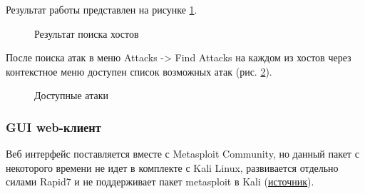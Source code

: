 \documentclass[10pt,a4paper,titlepage]{article}
\begin{document}
Результат работы представлен на рисунке \ref{ris:image4}.
\begin{figure}[h]	
\caption{Результат поиска хостов}
\label{ris:image4}
\end{figure}

После поиска атак в меню Attacks -> Find Attacks на каждом из хостов через контекстное меню доступен список возможных атак (рис. \ref{ris:image5}).
\begin{figure}[h]	
\caption{Доступные атаки}
\label{ris:image5}
\end{figure}

\subsubsection{GUI web-клиент}
Веб интерфейс поставляется вместе с Metasploit Community, но данный пакет с некоторого времени не идет в комплекте с Kali Linux, развивается отдельно силами Rapid7 и не поддерживает пакет metasploit в Kali (\href{https://www.offensive-security.com/metasploit-unleashed/armitage-setup/}{источник}).
\end{document}
